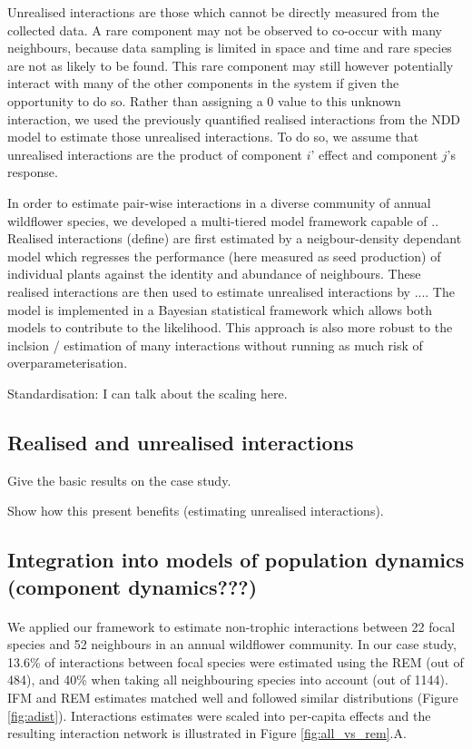 \documentclass[a4,12pt]{article}
\begin{document}
    Unrealised interactions are those which cannot be directly measured from the collected data. A rare component may not be observed to co-occur with many neighbours, because data sampling is limited in space and time and rare species are not as likely to be found. This rare component may still however potentially interact with many of the other components in the system if given the opportunity to do so. Rather than assigning a 0 value to this unknown interaction, we used the previously quantified realised interactions from the NDD model to estimate those unrealised interactions. To do so, we assume that unrealised interactions are the product of component $i$' effect and component $j$'s response.




    In order to estimate pair-wise interactions in a diverse community of annual wildflower species, we developed a multi-tiered model framework capable of .. Realised interactions (define) are first estimated by a neigbour-density dependant model which regresses the performance (here measured as seed production) of individual plants against the identity and abundance of neighbours. These realised interactions are then used to estimate unrealised interactions by .... The model is implemented in a Bayesian statistical framework which allows both models to contribute to the likelihood. This approach is also more robust to the inclsion / estimation of many interactions without running as much risk of overparameterisation. 


    Standardisation: I can talk about the scaling here. 

    \subsection{Realised and unrealised interactions}

    Give the basic results on the case study. 

    Show how this present benefits (estimating unrealised interactions).


    \subsection{Integration into models of population dynamics (component dynamics???)}
    


	\paragraph{} 
	We applied our framework to estimate non-trophic interactions between 22 focal species and 52 neighbours in an annual wildflower community. In our case study, 13.6\% of interactions between focal species were estimated using the REM (out of 484), and 40\% when taking all neighbouring species into account (out of 1144). IFM and REM estimates matched well and followed similar distributions (Figure \ref{fig:adist}). Interactions estimates were scaled into per-capita effects and the resulting interaction network is illustrated in Figure \ref{fig:all_vs_rem}.A.
\end{document}

